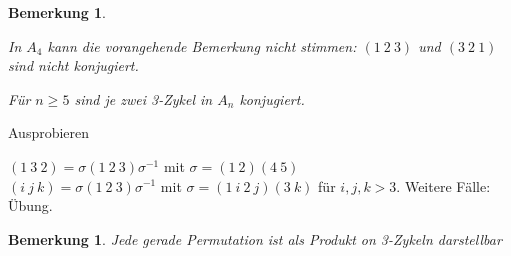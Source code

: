 \documentclass[a4paper,10pt,german]{scrbook}
\theoremstyle{saetze}
\theoremstyle{definitionen}
\newtheorem{Bem}[Def]{Bemerkung}
\begin{document}
\begin{Bem}
\label{konj3zykel}
\begin{enum}
\item In $A_4$ kann die vorangehende Bemerkung nicht stimmen: $(1\ 2\ 3)$ und $(3\ 2\ 1)$ sind nicht konjugiert.
\item Für $n\ge 5$ sind je zwei 3-Zykel in $A_n$ konjugiert.
\end{enum}
\end{Bem}

\bew{}
{\item Ausprobieren
\item $(1\ 3\ 2) = \sigma (1\ 2\ 3)\sigma^{-1}$ mit $\sigma = (1\ 2)(4\ 5)$\\
      $(i\ j\ k) = \sigma (1\ 2\ 3)\sigma^{-1}$ mit $\sigma = (1\ i\ 2\ j)(3\ k)$ für $i,j,k>3$. Weitere Fälle: Übung.
}

\begin{Bem}
\label{gerPerm3Zykel}
Jede gerade Permutation ist als Produkt on 3-Zykeln darstellbar
\end{Bem}

\end{document}

